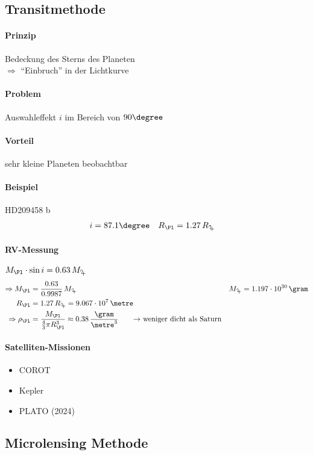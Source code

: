 \subsection{Transitmethode}
\paragraph{Prinzip} Bedeckung des Sterns des Planeten\\
$\Rightarrow$ "`Einbruch"' in der Lichtkurve

\paragraph{Problem} Auswahleffekt $i$ im Bereich von $90\degree$
\paragraph{Vorteil} sehr kleine Planeten beobachtbar
\paragraph{Beispiel} HD209458 b
\begin{align*}
    i &= 87.1\degree & R_{\Pl} &= 1.27\,R_{\jupiter}
\end{align*}
\paragraph{RV-Messung} $M_{\Pl} \cdot \sin i = 0.63\, M_{\jupiter}$
\begin{align*}
    \Rightarrow M_\Pl &= \frac{0.63}{0.9987}\,M_{\jupiter} & M_{\jupiter} &= 1.197 \cdot 10^{30}\,\gram \\
    R_\Pl &= 1.27\,R_{\jupiter} = 9.067 \cdot 10^{7}\,\metre \\
    \Rightarrow \rho_\Pl &= \frac{M_\Pl}{\frac{4}{3} \pi R_\Pl^3} \approx 0.38\,\frac{\gram}{\metre^3} \tag*{$\rightarrow$ weniger dicht als Saturn}
\end{align*}

\paragraph{Satelliten-Missionen}
\begin{itemize}
    \item COROT
    \item Kepler
    \item PLATO (2024)
\end{itemize}

\subsection{Microlensing Methode}
